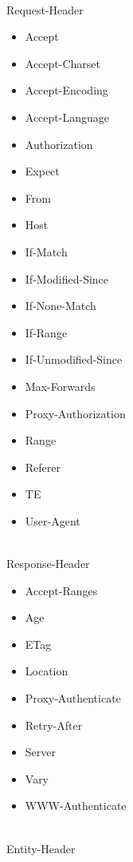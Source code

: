\documentclass{scrreprt}
\begin{document}
\\
    Request-Header\\
        \begin{itemize}
        \item Accept              
        \item Accept-Charset   
        \item Accept-Encoding  
        \item Accept-Language  
        \item Authorization    
        \item Expect           
        \item From             
        \item Host             
        \item If-Match         
        \item If-Modified-Since
        \item If-None-Match    
        \item If-Range         
        \item If-Unmodified-Since
        \item Max-Forwards       
        \item Proxy-Authorization
        \item Range              
        \item Referer            
        \item TE                 
        \item User-Agent  
        \end{itemize}
\\
    Response-Header\\
        \begin{itemize}
        \item Accept-Ranges 
        \item Age        
        \item ETag       
        \item Location   
        \item Proxy-Authenticate  
        \item Retry-After         
        \item Server              
        \item Vary                
        \item WWW-Authenticate
        \end{itemize}
\\
    Entity-Header\\
\end{document}
